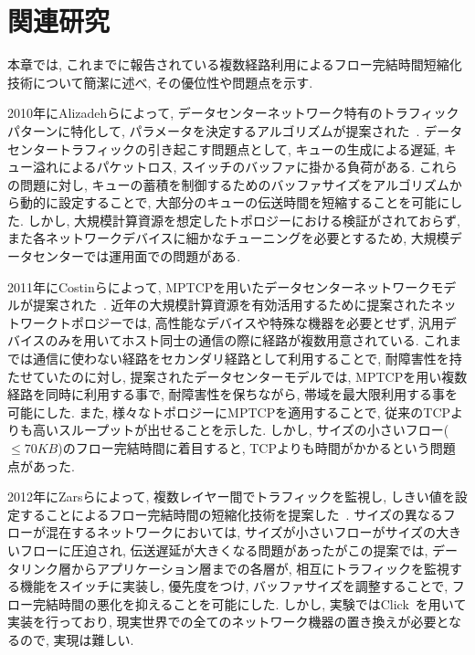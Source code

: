 \documentclass[10pt, a4paper, twocolumn]{jsarticle}
\begin{document}

\section{関連研究}
\label{sec:related}
本章では, これまでに報告されている複数経路利用によるフロー完結時間短縮化技術について簡潔に述べ, その優位性や問題点を示す.

2010年にAlizadehらによって, データセンターネットワーク特有のトラフィックパターンに特化して,
パラメータを決定するアルゴリズムが提案された~\cite{dctcp}.
データセンタートラフィックの引き起こす問題点として, キューの生成による遅延, キュー溢れによるパケットロス,
スイッチのバッファに掛かる負荷がある.
これらの問題に対し, キューの蓄積を制御するためのバッファサイズをアルゴリズムから動的に設定することで,
大部分のキューの伝送時間を短縮することを可能にした.
しかし, 大規模計算資源を想定したトポロジーにおける検証がされておらず, また各ネットワークデバイスに細かなチューニングを必要とするため,
大規模データセンターでは運用面での問題がある.

2011年にCostinらによって, MPTCPを用いたデータセンターネットワークモデルが提案された~\cite{improving}.
近年の大規模計算資源を有効活用するために提案されたネットワークトポロジーでは,
高性能なデバイスや特殊な機器を必要とせず, 汎用デバイスのみを用いてホスト同士の通信の際に経路が複数用意されている.
これまでは通信に使わない経路をセカンダリ経路として利用することで, 耐障害性を持たせていたのに対し, 提案されたデータセンターモデルでは,
MPTCPを用い複数経路を同時に利用する事で, 耐障害性を保ちながら, 帯域を最大限利用する事を可能にした.
また, 様々なトポロジーにMPTCPを適用することで, 従来のTCPよりも高いスループットが出せることを示した.
しかし, サイズの小さいフロー($\leq70KB$)のフロー完結時間に着目すると, TCPよりも時間がかかるという問題点があった.

2012年にZarsらによって, 複数レイヤー間でトラフィックを監視し,
しきい値を設定することによるフロー完結時間の短縮化技術を提案した~\cite{detail}.
サイズの異なるフローが混在するネットワークにおいては, サイズが小さいフローがサイズの大きいフローに圧迫され, 伝送遅延が大きくなる問題があったがこの提案では,
データリンク層からアプリケーション層までの各層が, 相互にトラフィックを監視する機能をスイッチに実装し, 優先度をつけ, バッファサイズを調整することで,
フロー完結時間の悪化を抑えることを可能にした.
しかし, 実験ではClick~\cite{click}を用いて実装を行っており, 現実世界での全てのネットワーク機器の置き換えが必要となるので, 実現は難しい.
\end{document}
